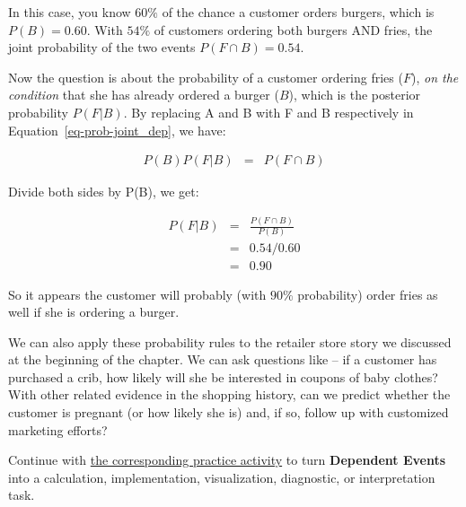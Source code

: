 \documentclass[
  letterpaper,
]{scrbook}
\begin{document}
In this case, you know \(60\%\) of the chance a customer orders burgers,
which is \(P(B) = 0.60\). With \(54\%\) of customers ordering both
burgers AND fries, the joint probability of the two events
\(P(F \cap B) = 0.54\).

Now the question is about the probability of a customer ordering fries
(\(F\)), \emph{on the condition} that she has already ordered a burger
(\(B\)), which is the posterior probability \(P(F|B)\). By replacing A
and B with F and B respectively in
Equation~\hyperref[eq-prob-joint_dep]{{[}eq-prob-joint\_dep{]}}, we
have:

\[\begin{aligned}
P(B) P(F|B) & = & P(F \cap B)
\end{aligned}\]

Divide both sides by P(B), we get:

\[\begin{aligned}
P(F|B)
& = & \frac{P(F \cap B)}{P(B)} \\
& = & 0.54 / 0.60 \\
& = & 0.90
\end{aligned}\]

So it appears the customer will probably (with \(90\%\) probability)
order fries as well if she is ordering a burger.

We can also apply these probability rules to the retailer store story we
discussed at the beginning of the chapter. We can ask questions like --
if a customer has purchased a crib, how likely will she be interested in
coupons of baby clothes? With other related evidence in the shopping
history, can we predict whether the customer is pregnant (or how likely
she is) and, if so, follow up with customized marketing efforts?

\begin{tcolorbox}[enhanced jigsaw, arc=.35mm, bottomrule=.15mm, bottomtitle=1mm, breakable, colback=white, colbacktitle=quarto-callout-tip-color!10!white, colframe=quarto-callout-tip-color-frame, coltitle=black, left=2mm, leftrule=.75mm, opacityback=0, opacitybacktitle=0.6, rightrule=.15mm, title=\textcolor{quarto-callout-tip-color}{\faLightbulb}\hspace{0.5em}{Put it into practice}, titlerule=0mm, toprule=.15mm, toptitle=1mm]

Continue with \hyperref[sec-pr-04-dependent-events]{the corresponding
practice activity} to turn \textbf{Dependent Events} into a calculation,
implementation, visualization, diagnostic, or interpretation task.

\end{tcolorbox}
\end{document}
